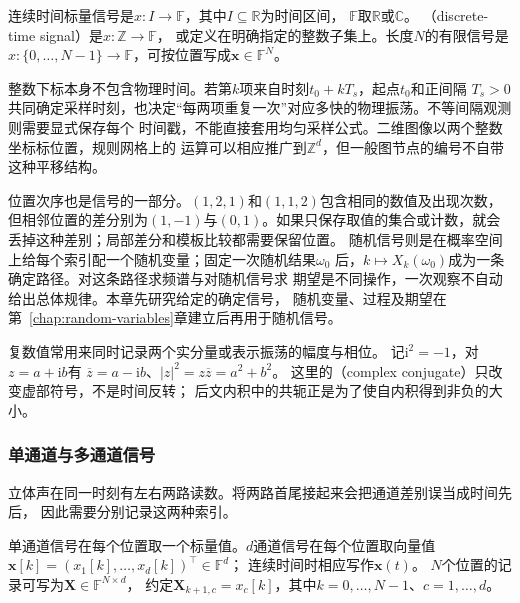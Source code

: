 \begin{definition}[信号的索引类型]
  \label{def:signal-index-types}
  连续时间标量信号是$x:I\to\mathbb F$，其中$I\subseteq\mathbb R$为时间区间，
  $\mathbb F$取$\mathbb R$或$\mathbb C$。
  （discrete-time signal）是$x:\mathbb Z\to\mathbb F$，
  或定义在明确指定的整数子集上。长度$N$的有限信号是
  $x:\{0,\ldots,N-1\}\to\mathbb F$，可按位置写成$\bm x\in\mathbb F^N$。
\end{definition}

整数下标本身不包含物理时间。若第$k$项来自时刻$t_0+kT_s$，起点$t_0$和正间隔
$T_s>0$共同确定采样时刻，也决定“每两项重复一次”对应多快的物理振荡。不等间隔观测则需要显式保存每个
时间戳，不能直接套用均匀采样公式。二维图像以两个整数坐标标位置，规则网格上的
运算可以相应推广到$\mathbb Z^d$，但一般图节点的编号不自带这种平移结构。

位置次序也是信号的一部分。$(1,2,1)$和$(1,1,2)$包含相同的数值及出现次数，
但相邻位置的差分别为$(1,-1)$与$(0,1)$。如果只保存取值的集合或计数，就会
丢掉这种差别；局部差分和模板比较都需要保留位置。
随机信号则是在概率空间上给每个索引配一个随机变量；固定一次随机结果$\omega_0$
后，$k\mapsto X_k(\omega_0)$成为一条确定路径。对这条路径求频谱与对随机信号求
期望是不同操作，一次观察不自动给出总体规律。本章先研究给定的确定信号，
随机变量、过程及期望在第~\ref{chap:random-variables}章建立后再用于随机信号。

复数值常用来同时记录两个实分量或表示振荡的幅度与相位。
记$\mathrm i^2=-1$，对$z=a+\mathrm ib$有
$\overline z=a-\mathrm ib$、$|z|^2=z\overline z=a^2+b^2$。
这里的（complex conjugate）只改变虚部符号，不是时间反转；
后文内积中的共轭正是为了使自内积得到非负的大小。

\subsubsection{单通道与多通道信号}

立体声在同一时刻有左右两路读数。将两路首尾接起来会把通道差别误当成时间先后，
因此需要分别记录这两种索引。
\begin{definition}[标量信号与向量值信号]
  \label{def:signal-multichannel}
  单通道信号在每个位置取一个标量值。$d$通道信号在每个位置取向量值
  $\bm x[k]=(x_1[k],\ldots,x_d[k])^\top\in\mathbb F^d$；
  连续时间时相应写作$\bm x(t)$。
  $N$个位置的记录可写为$\bm X\in\mathbb F^{N\times d}$，
  约定$\bm X_{k+1,c}=x_c[k]$，其中$k=0,\ldots,N-1$、$c=1,\ldots,d$。
\end{definition}

